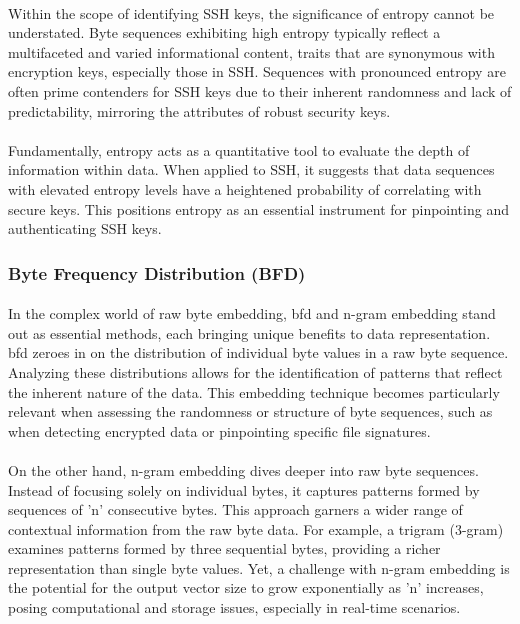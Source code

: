        \paragraph{}Within the scope of identifying SSH keys, the significance of entropy cannot be understated. Byte sequences exhibiting high entropy typically reflect a multifaceted and varied informational content, traits that are synonymous with encryption keys, especially those in SSH. Sequences with pronounced entropy are often prime contenders for SSH keys due to their inherent randomness and lack of predictability, mirroring the attributes of robust security keys.

        \paragraph{}Fundamentally, entropy acts as a quantitative tool to evaluate the depth of information within data. When applied to SSH, it suggests that data sequences with elevated entropy levels have a heightened probability of correlating with secure keys. This positions entropy as an essential instrument for pinpointing and authenticating SSH keys.
    \subsubsection{Byte Frequency Distribution (BFD)}
        \paragraph{}In the complex world of raw byte embedding, \acrfull{bfd} and n-gram embedding stand out as essential methods, each bringing unique benefits to data representation. \acrshort{bfd} zeroes in on the distribution of individual byte values in a raw byte sequence. Analyzing these distributions allows for the identification of patterns that reflect the inherent nature of the data. This embedding technique becomes particularly relevant when assessing the randomness or structure of byte sequences, such as when detecting encrypted data or pinpointing specific file signatures.

        \paragraph{}On the other hand, n-gram embedding dives deeper into raw byte sequences. Instead of focusing solely on individual bytes, it captures patterns formed by sequences of 'n' consecutive bytes. This approach garners a wider range of contextual information from the raw byte data. For example, a trigram (3-gram) examines patterns formed by three sequential bytes, providing a richer representation than single byte values. Yet, a challenge with n-gram embedding is the potential for the output vector size to grow exponentially as 'n' increases, posing computational and storage issues, especially in real-time scenarios.
        
